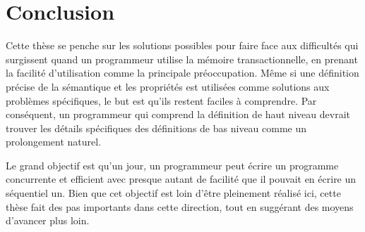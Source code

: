 \section{Conclusion}

Cette thèse se penche sur les solutions possibles pour faire face aux difficultés qui surgissent quand un programmeur utilise la mémoire transactionnelle, en prenant la facilité d'utilisation comme la principale préoccupation.
Même si une définition précise de la sémantique et les propriétés est utilisées comme solutions aux problèmes spécifiques, le but est qu'ils restent faciles à comprendre.
Par conséquent, un programmeur qui comprend la définition de haut niveau devrait trouver les détails spécifiques des définitions de bas niveau comme un prolongement naturel.



Le grand objectif est qu'un jour, un programmeur peut écrire un programme concurrente et efficient avec presque autant de facilité que il pouvait en écrire un séquentiel un.
Bien que cet objectif est loin d'être pleinement réalisé ici, cette thèse fait des pas importants dans cette direction, tout en suggérant des moyens d'avancer plus loin.

